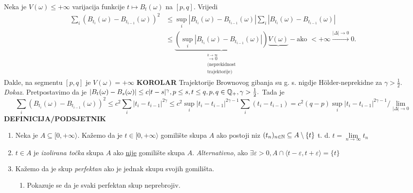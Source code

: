 \documentclass{article}
\begin{document}
Neka je \(V(\omega)\le+\infty\) varijacija funkcije \(t\mapsto B_t(\omega)\) na \([p,q].\) Vrijedi \[\begin{aligned}\sum_i\left(B_{t_i}(\omega)-B_{t_{i-1}}(\omega)\right)^2&\le\sup_i\left|B_{t_i}(\omega)-B_{t_{i-1}}(\omega)\right|\sum_i\left|B_{t_i}(\omega)-B_{t_{i-1}}(\omega)\right|\\&\le\underbrace{\left(\sup_i\left|B_{t_i}(\omega)-B_{t_{i-1}}(\omega)\right|\right)}_{\substack{\overset{k\to\infty}{\longrightarrow0}\\(\text{neprekidnost}\\\text{trajektorije})}}\underbrace{V(\omega)}-{\text{ako }<+\infty}\overset{|\Delta|\to 0}{\longrightarrow}0.\end{aligned}\] Dakle, na segmentu  \([p,q]\) je \(V(\omega)=+\infty\)\newline\newline
\textbf{KOROLAR}\newline
Trajektorije Brownovog gibanja su g. s. nigdje H\"older-neprekidne za \(\gamma>\frac12.\)\newline\newline
\textit{Dokaz.}\newline
Pretpostavimo da je \(|B_t(\omega)-B_s(\omega)|\le c|t-s|^\gamma,p\le s,t\le q,p,q\in\Bbb Q_+,\gamma>\frac12.\) Tada je \[\sum_i\left(B_{t_i}(\omega)-B_{t_{i-1}}(\omega)\right)^2\le c^2\sum_i\left|t_i-t_{i-1}\right|^{2\gamma}\le c^2\sup_i|t_i-t_{i-1}|^{2\gamma-1}\sum_i(t_i-t_{i-1})=c^2(q-p)\sup_i|t_i-t_{i-1}|^{2\gamma-1}\bigg/\lim_{|\Delta|\to0}\]
\textbf{DEFINICIJA/PODSJETNIK}
\begin{enumerate}
    \item[\ding{228}] Neka je \(A\subseteq[0,+\infty\rangle.\) Kažemo da je \(t\in[0,+\infty\rangle\) gomilište skupa \(A\) ako postoji niz \((t_n)_{n\in\Bbb N}\subseteq A\setminus\{t\}\) t. d. \(t=\lim\limits_{n\to\infty}t_n\) 
    \item[\ding{228}] \(t\in A\) je \emph{izolirana točka} skupa \(A\) ako \underline{nije} gomilište skupa \(A.\) \emph{Alternativno}, ako \(\exists\varepsilon>0,A\cap\langle t-\varepsilon,t+\varepsilon\rangle=\{t\}\)
    \item[\ding{228}] Kažemo da je skup \emph{perfektan} ako je jednak skupu svojih gomilišta.\begin{enumerate}
        \item[\ding{113}] Pokazuje se da je svaki perfektan skup neprebrojiv.  
    \end{enumerate}
\end{enumerate}
\end{document}
